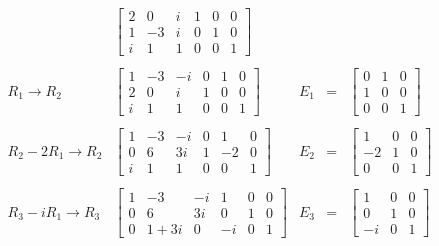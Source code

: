 \begin{enumerate}[\bfseries 1.]
	$$
	\begin{array}{rlrcl}
	    &
	    \left[
		\begin{array}{rrr|rrr}
		    2 & 0 & i &  1 & 0 & 0 \\
		    1 & -3 & i &  0 & 1 & 0 \\
		    i & 1 & 1 &  0 & 0 & 1
		\end{array}
	    \right]
	    &&&\\\\
	    R_1\to R_2&
	    \left[
		\begin{array}{rrr|rrr}
		    1 & -3 & -i &  0 & 1 & 0 \\
		    2 & 0 & i &  1 & 0 & 0 \\
		    i & 1 & 1 &  0 & 0 & 1
		\end{array}
	    \right]
	    &E_1&=&
	    \left[
		\begin{array}{rrr}
		    0&1&0\\
		    1&0&0\\
		    0&0&1
		\end{array}
	    \right]\\\\
	    R_2-2R_1\to R_2&
	    \left[
		\begin{array}{rrr|rrr}
		    1 & -3 & -i &  0 & 1 & 0 \\
		    0 & 6 & 3i &  1 & -2 & 0 \\
		    i & 1 & 1 &  0 & 0 & 1
		\end{array}
	    \right]
	    &E_2&=&
	    \left[
		\begin{array}{rrr}
		    1&0&0\\
		    -2&1&0\\
		    0&0&1
		\end{array}
	    \right]\\\\
	    R_3-iR_1\to R_3&
	    \left[
		\begin{array}{rrr|rrr}
		    1 & -3 & -i &  1 & 0 & 0 \\
		    0 & 6 & 3i &  0 & 1 & 0 \\
		    0 & 1+3i & 0 &  -i & 0 & 1
		\end{array}
	    \right]
	    &E_3&=&
	    \left[
		\begin{array}{rrr}
		    1&0&0\\
		    0&1&0\\
		    -i&0&1
		\end{array}
	    \right]
	\end{array}
	$$
	$$
	\begin{array}{rlrcl}

\end{array}$$
\end{enumerate}
